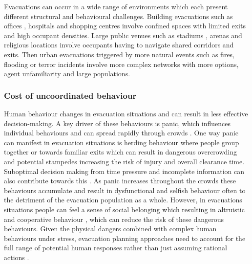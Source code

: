 \documentclass[12pt,a4paper]{report}
\begin{document}
Evacuations can occur in a wide range of environments which each present different structural and behavioural challenges. Building evacuations such as offices \citep{RONCHI_OFFICES_2013}, hospitals \citep{SAHEBI_HOSPITALS_2021} and shopping centres \citep{ALBIS_SHOPPING_CENTERS_2015} involve confined spaces with limited exits and high occupant densities. Large public venues such as stadiums \citep{KUO_STADIUMS_2025}, arenas and religious locations \citep{TOPRAKLI_RELIGION_2024} involve occupants having to navigate shared corridors and exits. Then urban evacuations \citep{SARMA_URBAN_2022,ALDAHLAWI_2024} triggered by more natural events such as fires, flooding or terror incidents involve more complex networks with more options, agent unfamiliarity and large populations.

\subsubsection{Cost of uncoordinated behaviour}
Human behaviour changes in evacuation situations and can result in less effective decision-making. A key driver of these behaviours is panic, which influences individual behaviours and can spread rapidly through crowds \citep{LE_BON_2024_PANIC}. One way panic can manifest in evacuation situations is herding behaviour where people group together or towards familiar exits which can result in dangerous overcrowding and potential stampedes \citep{LUGERING_2023_STAMPEDE} increasing the risk of injury and overall clearance time. Suboptimal decision making from time pressure and incomplete information can also contribute towards this \citep{LUGERING_2023_STAMPEDE}.  As panic increases throughout the crowds these behaviours accumulate and result in dysfunctional and selfish behaviour \citep{DE_IULISIS_2023_SELFISH} often to the detriment of the evacuation population as a whole. However, in evacuations situations people can feel a sense of social belonging which resulting in altruistic and cooperative behaviour \citep{COCKING_2009_SELFISH}, which can reduce the risk of these dangerous behaviours. Given the physical dangers combined with complex human behaviours under stress, evacuation planning approaches need to account for the full range of potential human responses rather than just assuming rational actions \citep{KYRIAKIDIS_2021_CONSIDER}.
\end{document}
